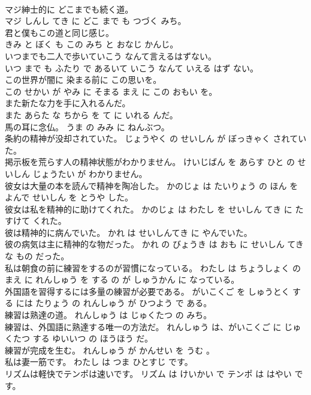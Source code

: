 \documentclass[8pt]{extreport}
\begin{document}
\begin{CJK}{UTF8}{min}
\\	マジ紳士的に どこまでも続く道。	
\\	マジ しんし てき に どこ まで も つづく みち。	
\\	君と僕もこの道と同じ感じ。	
\\	きみ と ぼく も この みち と おなじ かんじ。	
\\	いつまでも二人で歩いていこう なんて言えるはずない。	
\\	いつ まで も ふたり で あるいて いこう なんて いえる はず ない。	
\\	この世界が闇に 染まる前に この思いを。	
\\	この せかい が やみ に そまる まえ に この おもい を。	
\\	また新たな力を手に入れるんだ。	
\\	また あらた な ちから を て に いれる んだ。	
\\	馬の耳に念仏。	うま の みみ に ねんぶつ。	
\\	条約の精神が没却されていた。	じょうやく の せいしん が ぼっきゃく されていた。	
\\	掲示板を荒らす人の精神状態がわかりません。	けいじばん を あらす ひと の せいしん じょうたい が わかりません。	
\\	彼女は大量の本を読んで精神を陶冶した。	かのじょ は たいりょう の ほん を よんで せいしん を とうや した。	
\\	彼女は私を精神的に助けてくれた。	かのじょ は わたし を せいしん てき に たすけて くれた。	
\\	彼は精神的に病んでいた。	かれ は せいしんてき に やんでいた。	
\\	彼の病気は主に精神的な物だった。	かれ の びょうき は おも に せいしん てき な もの だった。	
\\	私は朝食の前に練習をするのが習慣になっている。	わたし は ちょうしょく の まえ に れんしゅう を する の が しゅうかん に なっている。	
\\	外国語を習得するには多量の練習が必要である。	がいこくご を しゅうとく する には たりょう の れんしゅう が ひつよう で ある。	
\\	練習は熟達の道。	れんしゅう は じゅくたつ の みち。	
\\	練習は、外国語に熟達する唯一の方法だ。	れんしゅう は、がいこくご に じゅくたつ する ゆいいつ の ほうほう だ。	
\\	練習が完成を生む。	れんしゅう が かんせい を うむ 。	
\\	私は妻一筋です。	わたし は つま ひとすじ です。	
\\	リズムは軽快でテンポは速いです。	リズム は けいかい で テンポ は はやい です。	

\end{CJK}
\end{document}
